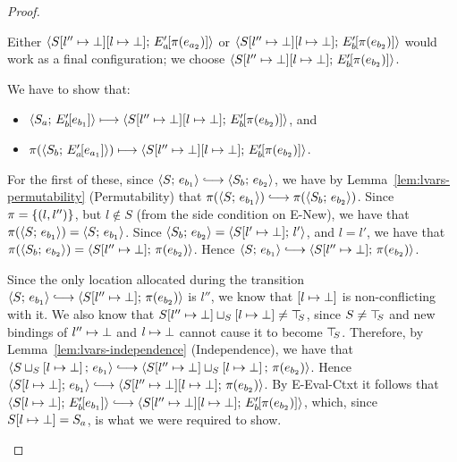 \begin{proof}
\begin{enumerate}
\begin{enumerate}
\begin{itemize}
          Either
          $\langle S[l'' \mapsto \bot][l \mapsto \bot];\, E'_a\hspace{-1mm}\left[\pi(e_{a_2})\right] \rangle$
          or
          $\langle S[l'' \mapsto \bot][l \mapsto \bot];\, E'_b\hspace{-1mm}\left[\pi(e_{b_2})\right] \rangle$
          would work as a final configuration; we choose
          $\langle S[l'' \mapsto \bot][l \mapsto \bot];\, E'_b\hspace{-1mm}\left[\pi(e_{b_2})\right] \rangle$.

          We have to show that:
          \begin{itemize}
          \item
            $\langle S_a;\, E'_b\hspace{-1mm}\left[e_{b_1}\right] \rangle \longmapsto
            \langle S[l'' \mapsto \bot][l \mapsto \bot];\, E'_b\hspace{-1mm}\left[\pi(e_{b_2})\right] \rangle$,
            and
          \item
            $\pi(\langle S_b;\, E'_a\hspace{-1mm}\left[e_{a_1}\right] \rangle) \longmapsto
            \langle S[l'' \mapsto \bot][l \mapsto \bot];\, E'_b\hspace{-1mm}\left[\pi(e_{b_2})\right] \rangle$.
          \end{itemize}

          For the first of these, since $\config{S}{e_{b_1}}
          \parstepsto \config{S_b}{e_{b_2}}$, we have by
          Lemma~\ref{lem:lvars-permutability} (Permutability) that
          $\pi(\config{S}{e_{b_1}}) \parstepsto
          \pi(\config{S_b}{e_{b_2}})$.  Since $\pi = \left\{(l,
            l'')\right\}$, but $l \notin S$ (from the side condition on {\sc
            E-New}), we have that $\pi(\langle S;\, e_{b_1} \rangle) =
          \langle S;\, e_{b_1} \rangle$. Since $\langle S_b;\, e_{b_2} \rangle =
          \langle S[l' \mapsto \bot];\, l' \rangle$, and $l = l'$, we have
          that $\pi(\langle S_b;\, e_{b_2} \rangle) =
          \langle S[l'' \mapsto \bot];\, \pi(e_{b_2}) \rangle$.  Hence
          $\config{S}{e_{b_1}} \parstepsto
          \config{\extSRaw{S}{l''}{\bot}}{\pi(e_{b_2})}$.

          Since the only location allocated during the transition
          $\config{S}{e_{b_1}} \parstepsto
          \config{\extSRaw{S}{l''}{\bot}}{\pi(e_{b_2})}$ is $l''$, we
          know that $\left[ l \mapsto \bot \right]$ is
          non-conflicting with it.  We also know that
          $S[l'' \mapsto \bot] \sqcup_{S} \left[ l \mapsto \bot \right]
          \neq \top\hspace{-0.85mm}_{S}$, since $S \neq \top\hspace{-0.85mm}_{S}$ and new bindings of
          $l'' \mapsto \bot$ and
          $l \mapsto \bot$ cannot cause it to become
          $\top\hspace{-0.85mm}_{S}$.  Therefore, by Lemma~\ref{lem:lvars-independence}
          (Independence), we have that
          $\config{\lubstore{S}{\store{\storebindingRaw{l}{\bot}}}}{e_{b_1}}
          \parstepsto
          \config{\lubstore{\extSRaw{S}{l''}{\bot}}{\store{\storebindingRaw{l}{\bot}}}}{\pi(e_{b_2})}$.
          Hence $\config{\extSRaw{S}{l}{\bot}}{e_{b_1}} \parstepsto
          \config{\extSRaw{\extSRaw{S}{l''}{\bot}}{l}{\bot}}{\pi(e_{b_2})}$.
          By {\sc E-Eval-Ctxt} it follows that
          $\config{\extSRaw{S}{l}{\bot}}{\evalctxt{E'_b}{e_{b_1}}}
          \parstepsto
          \config{\extSRaw{\extSRaw{S}{l''}{\bot}}{l}{\bot}}{\evalctxt{E'_b}{\pi(e_{b_2})}}$,
          which, since $S[l \mapsto \bot] = S_a$, is what we were
          required to show.


\end{itemize}
\end{enumerate}
\end{enumerate}
\end{proof}
